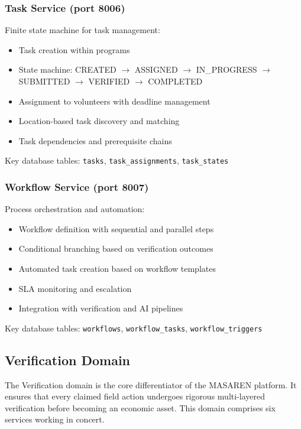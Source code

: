 \subsubsection{Task Service (port 8006)}

Finite state machine for task management:
\begin{itemize}
  \item Task creation within programs
  \item State machine: CREATED $\rightarrow$ ASSIGNED $\rightarrow$ IN\_PROGRESS $\rightarrow$ SUBMITTED $\rightarrow$ VERIFIED $\rightarrow$ COMPLETED
  \item Assignment to volunteers with deadline management
  \item Location-based task discovery and matching
  \item Task dependencies and prerequisite chains
\end{itemize}

Key database tables: \texttt{tasks}, \texttt{task\_assignments}, \texttt{task\_states}

\subsubsection{Workflow Service (port 8007)}

Process orchestration and automation:
\begin{itemize}
  \item Workflow definition with sequential and parallel steps
  \item Conditional branching based on verification outcomes
  \item Automated task creation based on workflow templates
  \item SLA monitoring and escalation
  \item Integration with verification and AI pipelines
\end{itemize}

Key database tables: \texttt{workflows}, \texttt{workflow\_tasks}, \texttt{workflow\_triggers}

\subsection{Verification Domain}

The Verification domain is the core differentiator of the MASAREN platform. It ensures that every claimed field action undergoes rigorous multi-layered verification before becoming an economic asset. This domain comprises six services working in concert.

